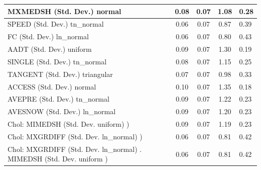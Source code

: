 \begin{table}
\begin{center}
\begin{tabular}{|l|l|c|c|c|l|}
			\hline
			MXMEDSH (Std. Dev.) normal &  & 0.08 & 0.07 & 1.08 & 0.28 \\
			\hline
			SPEED (Std. Dev.) tn_normal &  & 0.06 & 0.07 & 0.87 & 0.39 \\
			\hline
			FC (Std. Dev.) ln_normal &  & 0.06 & 0.07 & 0.80 & 0.43 \\
			\hline
			AADT (Std. Dev.) uniform &  & 0.09 & 0.07 & 1.30 & 0.19 \\
			\hline
			SINGLE (Std. Dev.) tn_normal &  & 0.08 & 0.07 & 1.15 & 0.25 \\
			\hline
			TANGENT (Std. Dev.) triangular &  & 0.07 & 0.07 & 0.98 & 0.33 \\
			\hline
			ACCESS (Std. Dev.) normal &  & 0.10 & 0.07 & 1.35 & 0.18 \\
			\hline
			AVEPRE (Std. Dev.) tn_normal &  & 0.09 & 0.07 & 1.22 & 0.23 \\
			\hline
			AVESNOW (Std. Dev.) ln_normal &  & 0.09 & 0.07 & 1.20 & 0.23 \\
			\hline
			 Chol: MIMEDSH (Std. Dev. uniform) ) &  & 0.09 & 0.07 & 1.19 & 0.23 \\
			\hline
			 Chol: MXGRDIFF (Std. Dev. ln_normal) ) &  & 0.06 & 0.07 & 0.81 & 0.42 \\
			\hline
			 Chol: MXGRDIFF (Std. Dev. ln_normal) . MIMEDSH (Std. Dev.   uniform ) &  & 0.06 & 0.07 & 0.81 & 0.42 \\
			\hline
		\end{tabular}
	\end{center}
\end{table}